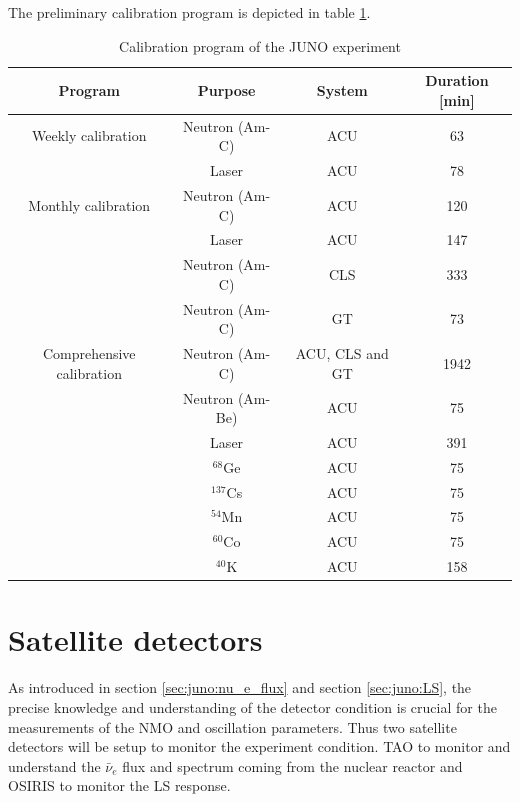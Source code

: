 The preliminary calibration program is depicted in table \ref{tab:juno:calib_prog}.

\begin{table}[ht]
  \centering
  \begin{tabular}{c c c c}
    \hline
    Program & Purpose & System & Duration [min] \\
    \hline
    Weekly calibration & Neutron (Am-C) & ACU & 63 \\
                       & Laser & ACU & 78  \\
                       \hline
    Monthly calibration & Neutron (Am-C) & ACU & 120 \\
                        & Laser  & ACU  & 147 \\
                        & Neutron (Am-C) & CLS & 333 \\
                        & Neutron (Am-C) & GT  & 73  \\
                        \hline
    Comprehensive calibration & Neutron (Am-C) & ACU, CLS and GT & 1942 \\
                              & Neutron (Am-Be) & ACU & 75 \\
                              & Laser & ACU & 391 \\
                              & $^{68}$Ge & ACU & 75 \\
                              & $^{137}$Cs & ACU & 75 \\
                              & $^{54}$Mn & ACU & 75 \\
                              & $^{60}$Co & ACU & 75 \\
                              & $^{40}$K & ACU & 158 \\
    \hline
  \end{tabular}
  \caption{Calibration program of the JUNO experiment}
  \label{tab:juno:calib_prog}
\end{table}

\section{Satellite detectors}
As introduced in section \ref{sec:juno:nu_e_flux} and section \ref{sec:juno:LS}, the precise knowledge and understanding of the detector condition is crucial for the measurements of the NMO and oscillation parameters. Thus two satellite detectors will be setup to monitor the experiment condition. TAO to monitor and understand the $\bar{\nu}_e$ flux and spectrum coming from the nuclear reactor and OSIRIS to monitor the LS response.

